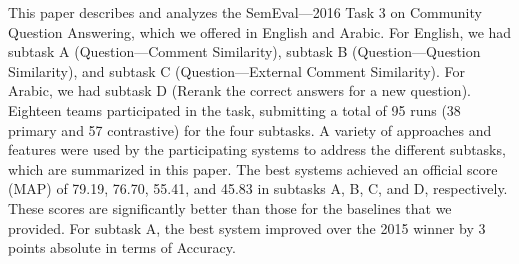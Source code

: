 This paper describes and analyzes the SemEval---2016 Task 3 on Community Question Answering, which we offered in English and Arabic. For English, we had subtask A (Question---Comment Similarity), subtask B (Question---Question Similarity), and subtask C (Question---External Comment Similarity). For Arabic, we had subtask D (Rerank the correct answers for a new question). Eighteen teams participated in the task, submitting a total of 95 runs (38 primary and 57 contrastive) for the four subtasks. A variety of approaches and features were used by the participating systems to address the different subtasks, which are summarized in this paper. The best systems achieved an official score (MAP) of 79.19, 76.70, 55.41, and 45.83 in subtasks A, B, C, and D, respectively. These scores are significantly better than those for the baselines that we provided. For subtask A, the best system improved over the 2015 winner by 3 points absolute in terms of Accuracy.

